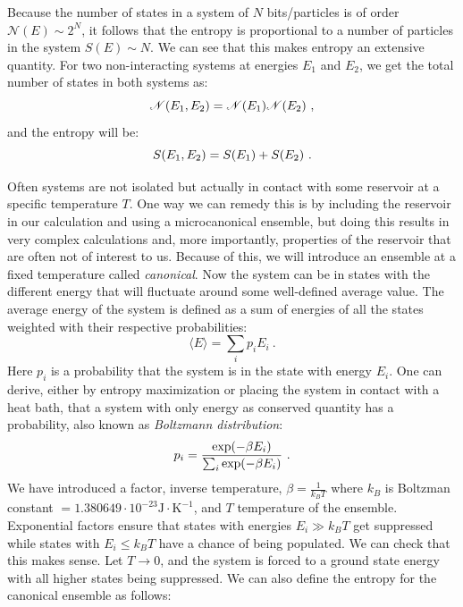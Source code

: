Because the number of states in a system of $N$ bits/particles is of order $\mathcal{N}(E) \sim 2^N$, it follows that the entropy is proportional to a number of particles in the system $S(E) \sim N$. We can see that this makes entropy an extensive quantity. For two non-interacting systems at energies $E_1$ and $E_2$, we get the total number of states in both systems as:
\begin{equation*}
	\mathcal{N}(E_1, E_2) = \mathcal{N}(E_1)\mathcal{N}(E_2) \ ,
\end{equation*}
and the entropy will be: 
\begin{equation*}
	S(E_1, E_2) = S(E_1) + S(E_2) \ .
\end{equation*}
\par
Often systems are not isolated but actually in contact with some reservoir at a specific temperature $T$. One way we can remedy this is by including the reservoir in our calculation and using a microcanonical ensemble, but doing this results in very complex calculations and, more importantly, properties of the reservoir that are often not of interest to us. Because of this, we will introduce an ensemble at a fixed temperature called \textit{canonical}. Now the system can be in states with the different energy that will fluctuate around some well-defined average value. The average energy of the system is defined as a sum of energies of all the states weighted with their respective probabilities:
\begin{equation}
	\langle E \rangle = \sum_i p_i E_i \  .
	\label{eq:averageenergy}
\end{equation}
Here $p_i$ is a probability that the system is in the state with energy $E_i$. One can derive, either by entropy maximization or placing the system in contact with a heat bath, that a system with only energy as conserved quantity has a probability, also known as \textit{Boltzmann distribution}:
\begin{equation}
	p_i = \frac{\exp(-\beta E_i)}{\sum_i \exp(-\beta E_i)} \ .
	\label{eq:canonicalprob}
\end{equation}
We have introduced a factor, inverse temperature, $\beta=\frac{1}{k_B T}$ where $k_B$ is Boltzman constant $=1.380649 \cdot 10^{-23} \text{J}\cdot\text{K}^{-1}$, and $T$ temperature of the ensemble. Exponential factors ensure that states with energies $E_i \gg k_B T$ get suppressed while states with $E_i \leq k_B T$ have a chance of being populated. We can check that this makes sense. Let $T \rightarrow 0$, and the system is forced to a ground state energy with all higher states being suppressed. We can also define the entropy for the canonical ensemble as follows:
